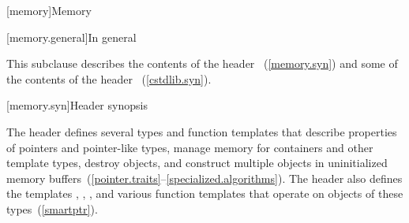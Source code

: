 [memory]{Memory}

[memory.general]{In general}

\pnum
This subclause describes the contents of the header
~(\ref{memory.syn}) and some
of the contents of the header ~(\ref{cstdlib.syn}).

[memory.syn]{Header  synopsis}

\pnum
The header  defines several types and function templates that
describe properties of pointers and pointer-like types, manage memory
for containers and other template types, destroy objects, and
construct multiple objects in
uninitialized memory
buffers~(\ref{pointer.traits}--\ref{specialized.algorithms}).
The header also defines the templates
, , , and various function
templates that operate on objects of these types~(\ref{smartptr}).


